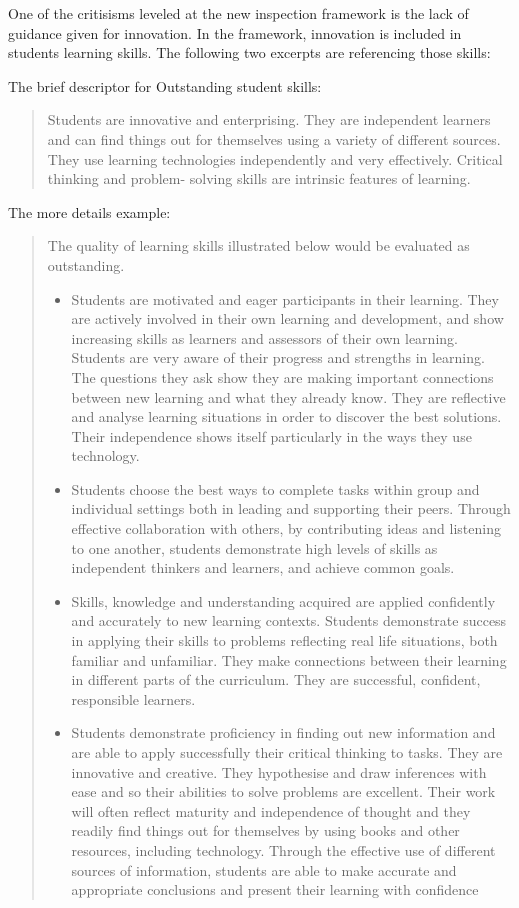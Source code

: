 One of the critisisms leveled at the new inspection framework is the lack of guidance given for innovation. In the framework, innovation is included in students learning skills. The following two excerpts are referencing those skills:

The brief descriptor for Outstanding student skills:
\begin{quote}
Students are innovative and enterprising. They are independent learners and can find things out for themselves using a variety of different sources. They use learning technologies independently and very effectively. Critical thinking and problem- solving skills are intrinsic features of learning.
\end{quote}

The more details example:
\begin{quote}
The quality of learning skills illustrated below would be evaluated as outstanding.
\begin{itemize}
\item Students are motivated and eager participants in their learning. They are actively involved in their own learning and development, and show increasing skills as learners and assessors of their own learning. Students are very aware of their progress and strengths in learning. The questions they ask show they are making important connections between new learning and what they already know. They are reflective and analyse learning situations in order to discover the best solutions. Their independence shows itself particularly in the ways they use technology.
\item Students choose the best ways to complete tasks within group and individual settings both in leading and supporting their peers. Through effective collaboration with others, by contributing ideas and listening to one another, students demonstrate high levels of skills as independent thinkers and learners, and achieve common goals.
\item Skills, knowledge and understanding acquired are applied confidently and accurately to new learning contexts. Students demonstrate success in applying their skills to problems reflecting real life situations, both familiar and unfamiliar. They make connections between their learning in different parts of the curriculum. They are successful, confident, responsible learners.
\item Students demonstrate proficiency in finding out new information and are able to apply successfully their critical thinking to tasks. They are innovative and creative. They hypothesise and draw inferences with ease and so their abilities to solve problems are excellent. Their work will often reflect maturity and independence of thought and they readily find things out for themselves by using books and other resources, including technology. Through the effective use of different sources of information, students are able to make accurate and appropriate conclusions and present their learning with confidence
\end{itemize}
\end{quote}

